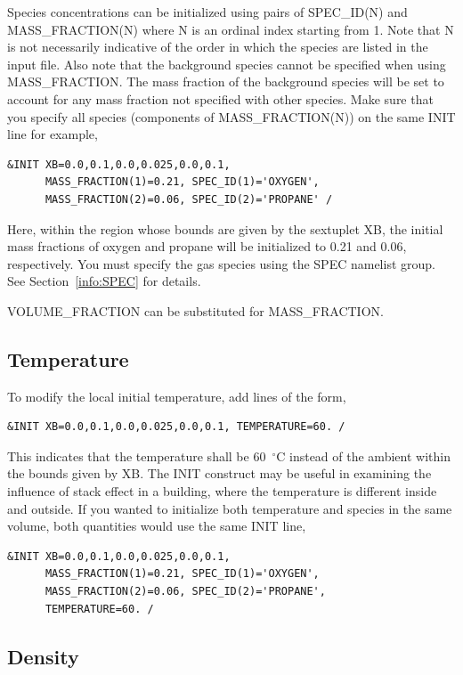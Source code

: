 \documentclass[11pt]{book}
\begin{document}
Species concentrations can be initialized using pairs of {\ct SPEC\_ID(N)} and {\ct MASS\_FRACTION(N)} where {\ct N} is an ordinal index starting from 1. Note that {\ct N} is not necessarily indicative of the order in which the species are listed in the input file. Also note that the background species cannot be specified when using {\ct MASS\_FRACTION}.  The mass fraction of the background species will be set to account for any mass fraction not specified with other species.
Make sure that you specify all species (components of {\ct MASS\_FRACTION(N)}) on the same {\ct INIT} line for example,
\begin{lstlisting}
&INIT XB=0.0,0.1,0.0,0.025,0.0,0.1,
      MASS_FRACTION(1)=0.21, SPEC_ID(1)='OXYGEN',
      MASS_FRACTION(2)=0.06, SPEC_ID(2)='PROPANE' /
\end{lstlisting}
Here, within the region whose bounds are given by the sextuplet {\ct XB}, the initial mass fractions of oxygen and propane will be initialized to 0.21 and 0.06, respectively. You must specify the gas species using the {\ct SPEC} namelist group. See Section~\ref{info:SPEC} for details.

{\ct VOLUME\_FRACTION} can be substituted for {\ct MASS\_FRACTION}.

\subsection*{Temperature}

To modify the local initial temperature, add lines of the form,
\begin{lstlisting}
&INIT XB=0.0,0.1,0.0,0.025,0.0,0.1, TEMPERATURE=60. /
\end{lstlisting}
This indicates that the temperature shall be 60~$^\circ$C instead of the ambient within the bounds given by {\ct XB}. The {\ct INIT} construct may be useful in examining the influence of stack effect in a building, where the temperature is different inside and outside. If you wanted to initialize both temperature and species in the same volume, both quantities would use the same {\ct INIT} line,
\begin{lstlisting}
&INIT XB=0.0,0.1,0.0,0.025,0.0,0.1,
      MASS_FRACTION(1)=0.21, SPEC_ID(1)='OXYGEN',
      MASS_FRACTION(2)=0.06, SPEC_ID(2)='PROPANE',
      TEMPERATURE=60. /
\end{lstlisting}

\subsection*{Density}
\end{document}

